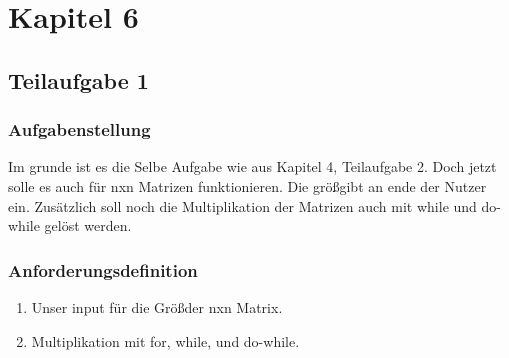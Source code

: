 \section{Kapitel 6}
\subsection{Teilaufgabe 1}
\subsubsection{Aufgabenstellung}
Im grunde ist es die Selbe Aufgabe wie aus Kapitel 4, Teilaufgabe 2. Doch jetzt solle es auch
für nxn Matrizen funktionieren. Die grö\ss\space gibt an ende der Nutzer ein. Zusätzlich soll
noch die Multiplikation der Matrizen auch mit while und do-while gelöst werden.

\subsubsection{Anforderungsdefinition}
\begin{enumerate}
	\item Unser input für die Grö\ss\space der nxn Matrix.
	\item Multiplikation mit for, while, und do-while.
\end{enumerate}

